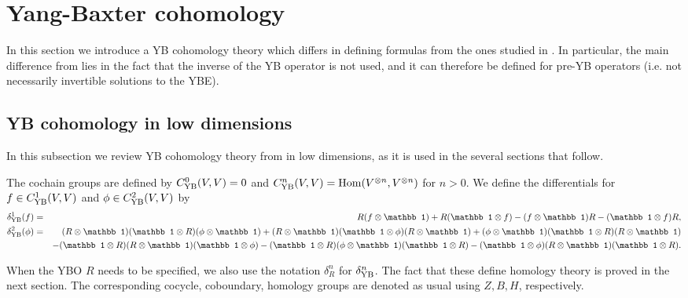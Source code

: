 \documentclass[11pt,fleqn]{amsart} %
\begin{document}
\section{Yang-Baxter cohomology}\label{sec:YB_coh}


In this section we introduce a YB cohomology theory which differs in defining formulas from the ones studied in \cite{Eis1,Eis,Lebed,Jozef}. 
In particular, the main difference  from \cite{Eis1,Eis} lies in  the fact that the inverse of the YB operator is not used, and it can therefore be defined for pre-YB operators (i.e. not necessarily invertible solutions to the YBE). 

\subsection{YB cohomology in low dimensions}

In this subsection we review YB cohomology theory from \cite{SZ-YBH} in low dimensions, as it is used in the several sections that follow.

The cochain groups are defined by 
$C^0_{\rm YB}(V,V)=0$ and 
$C^n_{\rm YB}(V,V)={\rm Hom} (V^{\otimes n},V^{\otimes n})$ for $n>0$.
We define the differentials for $f \in C^1_{\rm YB}(V,V) $
and $\phi \in C^2_{\rm YB}(V,V)$ by 
\begin{eqnarray*}
	\delta^1_{\rm YB} (f) 
	&=&
	R ( f \otimes {\mathbb 1}) + R ( {\mathbb 1} \otimes  f ) 
	-  ( f \otimes {\mathbb 1}) R - ( {\mathbb 1} \otimes  f )  R ,\\
	\delta^2_{\rm YB} (\phi) &=&
	(R \otimes {\mathbb 1} ) ( {\mathbb 1}  \otimes R ) ( \phi \otimes  {\mathbb 1} )
	+ (R \otimes {\mathbb 1} ) ( {\mathbb 1}  \otimes \phi ) ( R \otimes  {\mathbb 1} )
	+  (\phi \otimes {\mathbb 1} ) ( {\mathbb 1}  \otimes R ) ( R \otimes  {\mathbb 1} ) \\
	& & -  ( {\mathbb 1}  \otimes R ) ( R \otimes  {\mathbb 1} ) ( {\mathbb 1}  \otimes \phi ) 
	- ( {\mathbb 1}  \otimes R ) ( \phi \otimes  {\mathbb 1} ) ( {\mathbb 1}  \otimes  R ) 
	- ( {\mathbb 1}  \otimes \phi ) ( R \otimes  {\mathbb 1} ) ( {\mathbb 1}  \otimes  R ) .
\end{eqnarray*}

 When the YBO $R$ needs to be specified, we also use the notation $\delta^n_{R}$
for $\delta^n_{\rm YB}$. 
The fact that these define homology theory  is proved in the next section.
The corresponding cocycle, coboundary, homology groups are denoted as usual using $Z, B, H$, respectively.
\end{document}
